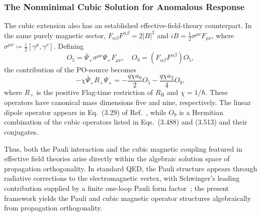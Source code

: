 \subsubsection{The Nonminimal Cubic Solution for Anomalous Response}
The cubic extension also has an established effective-field-theory counterpart. In the same purely magnetic sector, $F_{\alpha\beta}F^{\alpha\beta}=2|B|^2$ and $iB=\frac{1}{2}\sigma^{\mu\nu}F_{\mu\nu}$, where $\sigma^{\mu\nu}\coloneqq\frac{i}{2}[\gamma^\mu,\gamma^\nu]$. Defining
\begin{equation}
    O_5=\bar{\Psi}_+\sigma^{\mu\nu}\Psi_+F_{\mu\nu},\quad O_9=(F_{\alpha\beta}F^{\alpha\beta})O_5,
\end{equation}
the contribution of the PO-source becomes
\begin{equation}
    -\chi\bar{\Psi}_+R_+\Psi_+=-\frac{q\chi a_{0}}{2}O_5-\frac{q\chi a_{2}}{4}O_9,
\end{equation}
where $R_+$ is the positive Flag-time restriction of $R_{\mathrm{B}}$ and $\chi=1/\hbar$. These operators have canonical mass dimensions five and nine, respectively. The linear dipole operator appears in Eq.~(3.29) of Ref.~\cite{li2021_left_dim9}, while $O_9$ is a Hermitian combination of the cubic operators listed in Eqs.~(3.488) and (3.513) and their conjugates.

Thus, both the Pauli interaction and the cubic magnetic coupling featured in effective field theories arise directly within the algebraic solution space of propagation orthogonality. In standard QED, the Pauli structure appears through radiative corrections to the electromagnetic vertex, with Schwinger's leading contribution supplied by a finite one-loop Pauli form factor~\cite{schwinger1948_magnetic_moment}; the present framework yields the Pauli and cubic magnetic operator structures algebraically from propagation orthogonality.
